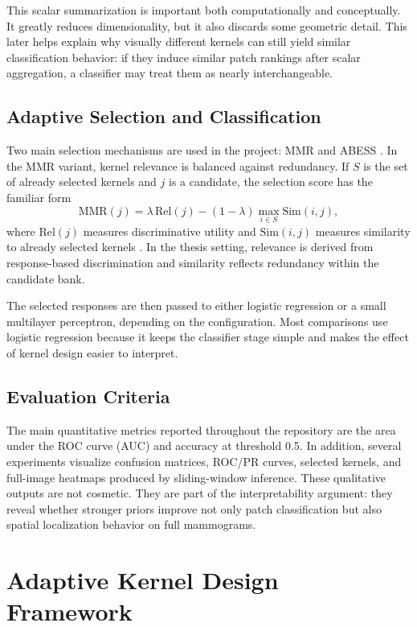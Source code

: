 \documentclass{cernatsnote}
\let\oldsection\section
\let\oldsubsection\subsection
\let\oldsubsubsection\subsubsection
\let\chapter\oldsection
\let\section\oldsubsection
\let\subsection\oldsubsubsection
\begin{document}
This scalar summarization is important both computationally and conceptually. It greatly reduces dimensionality, but it also discards some geometric detail. This later helps explain why visually different kernels can still yield similar classification behavior: if they induce similar patch rankings after scalar aggregation, a classifier may treat them as nearly interchangeable.

\section{Adaptive Selection and Classification}
Two main selection mechanisms are used in the project: MMR and ABESS \citep{goldstein1998mmr,zhu2020abess,zhu2022abess}. In the MMR variant, kernel relevance is balanced against redundancy. If $S$ is the set of already selected kernels and $j$ is a candidate, the selection score has the familiar form
\[
\text{MMR}(j) = \lambda \, \text{Rel}(j) - (1-\lambda)\max_{i \in S}\text{Sim}(i,j),
\]
where $\text{Rel}(j)$ measures discriminative utility and $\text{Sim}(i,j)$ measures similarity to already selected kernels \citep{goldstein1998mmr}. In the thesis setting, relevance is derived from response-based discrimination and similarity reflects redundancy within the candidate bank.

The selected responses are then passed to either logistic regression or a small multilayer perceptron, depending on the configuration. Most comparisons use logistic regression because it keeps the classifier stage simple and makes the effect of kernel design easier to interpret.

\section{Evaluation Criteria}
The main quantitative metrics reported throughout the repository are the area under the ROC curve (AUC) \citep{fawcett2006roc,hanley1982auc} and accuracy at threshold 0.5. In addition, several experiments visualize confusion matrices, ROC/PR curves, selected kernels, and full-image heatmaps produced by sliding-window inference. These qualitative outputs are not cosmetic. They are part of the interpretability argument: they reveal whether stronger priors improve not only patch classification but also spatial localization behavior on full mammograms.

\chapter{Adaptive Kernel Design Framework}
\end{document}
